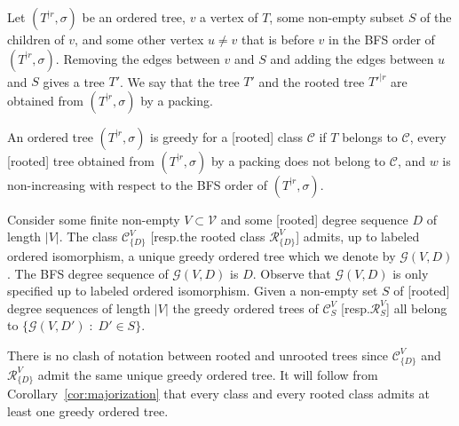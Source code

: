 \documentclass[11 pt]{modarticle}
\newcommand{\vset}{\mathcal{V}}
\newcommand{\wmap}{w}
\newcommand{\size}[1]{|#1|}
\newcommand{\rtree}[2]{{#1}^{\lvert #2}}
\newcommand{\ortree}[3]{(\rtree{#1}{#2},{#3})}
\newcommand{\tclass}{\mathcal{C}}
\newcommand{\rtclass}{\mathcal{R}}
\newcommand{\greedy}[2]{\mathcal{G}(#1,#2)}
\newcommand{\pclass}[2]{\tclass^{#1}_{#2}}
\newcommand{\rpclass}[2]{\rtclass^{#1}_{#2}}
\begin{document}
\begin{defi}
Let $\ortree{T}{r}{\sigma}$ be an ordered tree, $v$ a vertex of $T$, some non-empty subset $S$ of the children of $v$, and some other vertex $u \neq v$ that is before $v$ in the BFS order of $\ortree{T}{r}{\sigma}$. Removing the edges between $v$ and $S$ and adding the edges between $u$ and $S$ gives a tree $T'$. We say that the tree $T'$ and the rooted tree $\rtree{T'}{r}$ are obtained from $\ortree{T}{r}{\sigma}$ by a packing.
\end{defi}

\begin{defi}
An ordered tree $\ortree{T}{r}{\sigma}$ is greedy for a [rooted] class $\tclass$ if $T$ belongs to $\tclass$, every [rooted] tree obtained from $\ortree{T}{r}{\sigma}$ by a packing does not belong to $\tclass$, and $\wmap$ is non-increasing with respect to the BFS order of $\ortree{T}{r}{\sigma}$.
\end{defi}

Consider some finite non-empty $V \subset \vset$ and some [rooted] degree sequence $D$ of length $\size{V}$. The class $\pclass{V}{\{D\}}$ [resp.\@ the rooted class $\rpclass{V}{\{D\}}$] admits, up to labeled ordered isomorphism, a unique greedy ordered tree which we denote by $\greedy{V}{D}$. The BFS degree sequence of $\greedy{V}{D}$ is $D$. Observe that $\greedy{V}{D}$ is only specified up to labeled ordered isomorphism. Given a non-empty set $S$ of [rooted] degree sequences of length $\size{V}$ the greedy ordered trees of $\pclass{V}{S}$ [resp.\@ $\rpclass{V}{S}$] all belong to $\{\greedy{V}{D'} \;:\; D' \in S\}$.

There is no clash of notation between rooted and unrooted trees since $\pclass{V}{\{D\}}$ and $\rpclass{V}{\{D\}}$ admit the same unique greedy ordered tree.
It will follow from Corollary~\ref{cor:majorization} that every class and every rooted class admits at least one greedy ordered tree.
\end{document}
